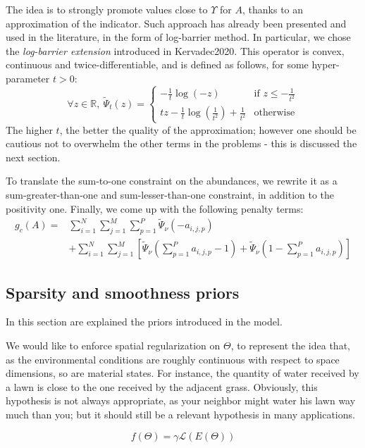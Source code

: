 \documentclass[conference]{IEEEtran}
\begin{document}
The idea is to strongly promote values close to $\Upsilon$ for $A$, thanks to an approximation of the indicator. Such approach has already been presented and used in the literature, in the form of log-barrier method. In particular, we chose the \emph{log-barrier extension} introduced in Kervadec2020. This operator is convex, continuous and twice-differentiable, and is defined as follows, for some hyper-parameter $t > 0$:
$$\forall z\in \mathbb{R},\ \tilde\Psi_t (z) = \begin{cases} - \frac{1}{t} \log (-z) & \text{if } z \leq -\frac{1}{t^2}\\ tz - \frac{1}{t} \log(\frac{1}{t^2}) + \frac{1}{t^2} & \text{otherwise} \end{cases}$$
The higher $t$, the better the quality of the approximation; however one should be cautious not to overwhelm the other terms in the problems - this is discussed the next section.

To translate the sum-to-one constraint on the abundances, we rewrite it as a sum-greater-than-one and sum-lesser-than-one constraint, in addition to the positivity one. Finally, we come up with the following penalty terms:
\begin{equation}\label{eq:g_c}
\begin{split}
  g_c (A) = & \sum_{i = 1}^N \sum_{j = 1}^M \sum_{p=1}^P \tilde\Psi_\nu (-a_{i,j,p})\\
  &+ \sum_{i = 1}^N \sum_{j = 1}^M \left[ \tilde\Psi_\nu(\sum_{p=1}^P a_{i,j,p} - 1) + \tilde\Psi_\nu(1 - \sum_{p=1}^Pa_{i,j,p}) \right]
\end{split}
\end{equation}

\subsection{Sparsity and smoothness priors}
In this section are explained the priors introduced in the model.

We would like to enforce spatial regularization on $\Theta$, to represent the idea that, as the environmental conditions are roughly continuous with respect to space dimensions, so are material states. For instance, the quantity of water received by a lawn is close to the one received by the adjacent grass. Obviously, this hypothesis is not always appropriate, as your neighbor might water his lawn way much than you; but it should still be a relevant hypothesis in many applications.

\begin{equation}\label{eq:f}
  f(\Theta) = \gamma \mathcal{L}(E(\Theta))
\end{equation}
\end{document}
